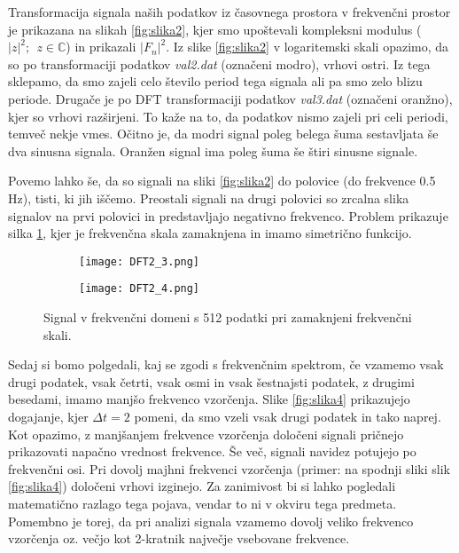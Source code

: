 \documentclass[12pt,a4paper]{article}
\begin{document}
Transformacija signala naših podatkov iz časovnega prostora v frekvenčni prostor je prikazana na slikah \ref{fig:slika2}, kjer smo upoštevali kompleksni modulus ($|z|^{2}; \ \ z \in \mathbb{C} $) in prikazali $|F_n|^{2}$. Iz slike \ref{fig:slika2} v logaritemski skali opazimo, da so po transformaciji podatkov  \textit{val2.dat} (označeni modro), vrhovi ostri. Iz tega sklepamo, da smo zajeli celo število period tega signala ali pa smo zelo blizu periode. Drugače je po DFT transformaciji podatkov \textit{val3.dat} (označeni oranžno), kjer so vrhovi razširjeni. To kaže na to, da podatkov nismo zajeli pri celi periodi, temveč nekje vmes. Očitno je, da modri signal poleg belega šuma sestavljata še dva sinusna signala. Oranžen signal ima poleg šuma še štiri sinusne signale.

Povemo lahko še, da so signali na sliki \ref{fig:slika2} do polovice (do frekvence 0.5 Hz), tisti, ki jih iščemo. Preostali signali na drugi polovici so zrcalna slika signalov na prvi polovici in predstavljajo negativno frekvenco. Problem prikazuje silka \ref{fig:slika3}, kjer je frekvenčna skala zamaknjena in imamo simetrično funkcijo.

\begin{figure}[H]
    \centering
    \begin{subfigure}[b]{0.45\textwidth}
        \texttt{[image: DFT2\_3.png]}
    \end{subfigure}
    \begin{subfigure}[b]{0.45\textwidth}
        \texttt{[image: DFT2\_4.png]}
    \end{subfigure}
    \caption{Signal v frekvenčni domeni s 512 podatki pri zamaknjeni frekvenčni skali.} \label{fig:slika3}
\end{figure}

Sedaj si bomo polgedali, kaj se zgodi s frekvenčnim spektrom, če vzamemo vsak drugi podatek, vsak četrti, vsak osmi in vsak šestnajsti podatek, z drugimi besedami, imamo manjšo frekvenco vzorčenja. Slike \ref{fig:slika4} prikazujejo dogajanje, kjer $\Delta t=2$ pomeni, da smo vzeli vsak drugi podatek in  tako naprej. Kot opazimo, z manjšanjem frekvence vzorčenja določeni signali pričnejo prikazovati napačno vrednost frekvence. Še več, signali navidez potujejo po frekvenčni osi. Pri dovolj majhni frekvenci vzorčenja (primer: na spodnji sliki slik \ref{fig:slika4}) določeni vrhovi izginejo. Za zanimivost bi si lahko pogledali matematično razlago tega pojava, vendar to ni v okviru tega predmeta. Pomembno je torej, da pri analizi signala vzamemo dovolj veliko frekvenco vzorčenja oz. večjo kot 2-kratnik največje vsebovane frekvence.
\end{document}
